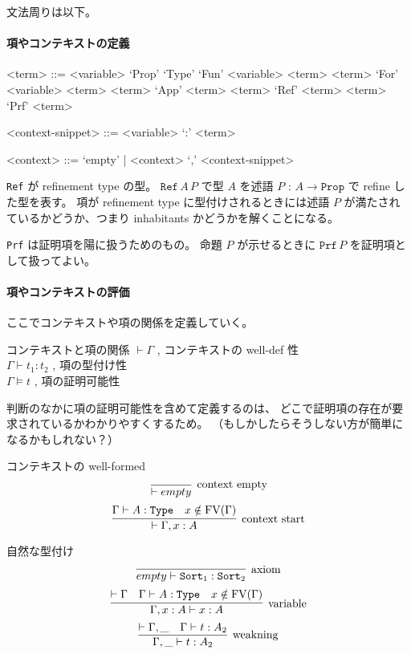 文法周りは以下。

\paragraph*{項やコンテキストの定義}
\begin{grammar}
<term> ::= <variable> 
\alt `Prop'
\alt `Type'
\alt `Fun' <variable> <term> <term>
\alt `For' <variable> <term> <term>
\alt `App' <term> <term>
\alt `Ref' <term> <term>
\alt `Prf' <term>

<context-snippet> ::= <variable> `:' <term>

<context> ::= `empty' | <context> `,' <context-snippet>
\end{grammar}

\texttt{Ref} が refinement type の型。
\(\texttt{Ref} \, A \, P\) で型 \(A\) を述語 \(P\) : \(A \to \texttt{Prop}\) で refine した型を表す。
項が refinement type に型付けされるときには述語 \(P\) が満たされているかどうか、つまり inhabitants かどうかを解くことになる。

\texttt{Prf} は証明項を陽に扱うためのもの。
命題 \(P\) が示せるときに \(\texttt{Prf} \, P\) を証明項として扱ってよい。

\paragraph*{項やコンテキストの評価}
ここでコンテキストや項の関係を定義していく。

\begin{itembox}[l]{コンテキストと項の関係}
  \(\vdash \Gamma\) , コンテキストの well-def 性 \\
  \(\Gamma \vdash t_1 : t_2\) , 項の型付け性 \\
  \(\Gamma \vDash t\) , 項の証明可能性
\end{itembox}

判断のなかに項の証明可能性を含めて定義するのは、
どこで証明項の存在が要求されているかわかりやすくするため。
（もしかしたらそうしない方が簡単になるかもしれない？）

\begin{itembox}[l]{コンテキストの well-formed}
  \[\infer[\text{context empty}]{\vdash empty}{}\]
  \[\infer[\text{context start}]{\vdash \Gamma , x : A}{\Gamma \vdash A : \texttt{Type} & x \notin \text{FV}(\Gamma)}\]
\end{itembox}

\begin{itembox}[l]{自然な型付け}
  \[\infer[\text{axiom}]{empty \vdash \texttt{Sort}_1 : \texttt{Sort}_2}{}\]
  \[\infer[\text{variable}]{\Gamma , x : A \vdash x : A}{\vdash \Gamma & \Gamma \vdash A : \texttt{Type} & x \notin \text{FV}(\Gamma)}\]
  \[\infer[\text{weakning}]{\Gamma , \_ \vdash t : A_2}{\vdash \Gamma , \_ & \Gamma \vdash t : A_2}\]
\end{itembox}

